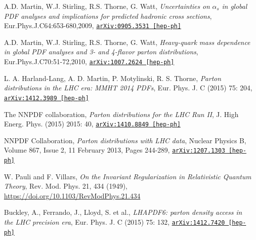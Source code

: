 \documentclass[11pt,a4paper,openright,twoside]{report}
\newcommand{\bibref}[4]{#1, \textit{#2}, #3 #4}
\begin{document}
\begin{thebibliography}{9}
	\bibref{A.D. Martin, W.J. Stirling, R.S. Thorne, G. Watt}{Uncertainties on $\alpha_s$ in global PDF analyses and implications for predicted hadronic cross sections}{Eur.Phys.J.C64:653-680,2009,}{\href{https://arxiv.org/abs/0905.3531}{\texttt{arXiv:0905.3531 [hep-ph]}}}
	
	\bibref{A.D. Martin, W.J. Stirling, R.S. Thorne, G. Watt}{Heavy-quark mass dependence in global PDF analyses and 3- and 4-flavor parton distributions}{Eur.Phys.J.C70:51-72,2010,}{\href{https://arxiv.org/abs/1007.2624}{\texttt{arXiv:1007.2624 [hep-ph]}}}
	
	\bibref{L. A. Harland-Lang, A. D. Martin, P. Motylinski, R. S. Thorne}{Parton distributions in the LHC era: MMHT 2014 PDFs}{Eur. Phys. J. C (2015) 75: 204,}{\href{https://arxiv.org/abs/1412.3989}{\texttt{arXiv:1412.3989 [hep-ph]}}}
	
	\bibref{The NNPDF collaboration}{Parton distributions for the LHC Run II}{J. High Energ. Phys. (2015) 2015: 40,}{\href{https://arxiv.org/abs/1410.8849}{\texttt{arXiv:1410.8849 [hep-ph]}}}
	
	\bibref{NNPDF Collaboration}{Parton distributions with LHC data}{Nuclear Physics B, Volume 867, Issue 2, 11 February 2013, Pages 244-289,}{\href{https://arxiv.org/abs/1207.1303}{\texttt{arXiv:1207.1303 [hep-ph]}}}

	\bibref{W. Pauli and F. Villars}{On the Invariant Regularization in Relativistic Quantum Theory}{Rev. Mod. Phys. 21, 434 (1949),}{\url{https://doi.org/10.1103/RevModPhys.21.434}}
	
	\bibref{Buckley, A., Ferrando, J., Lloyd, S. et al.}{LHAPDF6: parton density access in the LHC precision era}{Eur. Phys. J. C (2015) 75: 132,}{\href{https://arxiv.org/abs/1412.7420}{\texttt{arXiv:1412.7420 [hep-ph]}}}


\end{thebibliography}
\end{document}
